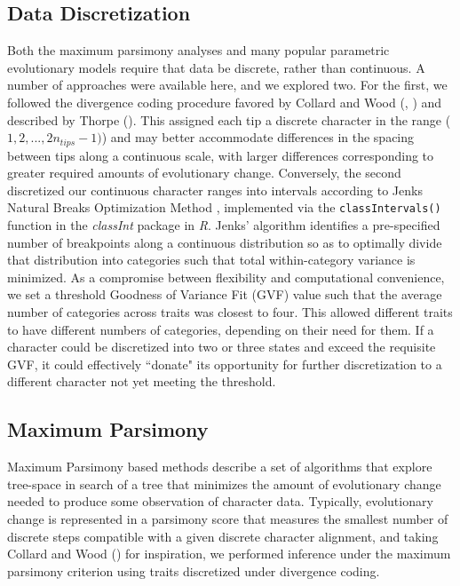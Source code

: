 \documentclass[10pt, twocolumn, twoside]{article}
\begin{document}
\subsection{Data Discretization}

Both the maximum parsimony analyses and many popular parametric evolutionary models require that data be discrete, rather than continuous. A number of approaches were available here, and we explored two. For the first, we followed the divergence coding procedure favored by Collard and Wood (\citeyear{collardHowReliableAre2000}, \citeyear{collardHowReliableAre2001}) and described by Thorpe (\citeyear{thorpeCodingMorphometricCharacters1984}). This assigned each tip a discrete character in the range ($1, 2, ..., 2n_{tips} - 1)$) and may better accommodate differences in the spacing between tips along a continuous scale, with larger differences corresponding to greater required amounts of evolutionary change. Conversely, the second discretized our continuous character ranges into intervals according to Jenks Natural Breaks Optimization Method \citep{jenksDataModelConcept1967}, implemented via the \texttt{classIntervals()} function in the \textit{classInt} package \citep{bivandPackageClassInt2020} in \textit{R}. Jenks' algorithm identifies a pre-specified number of breakpoints along a continuous distribution so as to optimally divide that distribution into categories such that total within-category variance is minimized. As a compromise between flexibility and computational convenience, we set a threshold Goodness of Variance Fit (GVF) value such that the average number of categories across traits was closest to four. This allowed different traits to have different numbers of categories, depending on their need for them. If a character could be discretized into two or three states and exceed the requisite GVF, it could effectively ``donate" its opportunity for further discretization to a different character not yet meeting the threshold.

\subsection{Maximum Parsimony}

Maximum Parsimony based methods describe a set of algorithms that explore tree-space in search of a tree that minimizes the amount of evolutionary change needed to produce some observation of character data. Typically, evolutionary change is represented in a parsimony score that measures the smallest number of discrete steps compatible with a given discrete character alignment, and taking Collard and Wood (\citeyear{collardHowReliableAre2000}) for inspiration, we performed inference under the maximum parsimony criterion using traits discretized under divergence coding.
\end{document}
